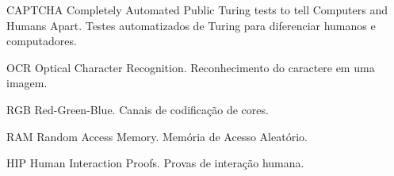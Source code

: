 \begin{siglas}
  \item[CAPTCHA] Completely Automated Public Turing tests to tell Computers and Humans Apart. Testes automatizados de Turing para diferenciar humanos e computadores.
  \item[OCR] Optical Character Recognition. Reconhecimento do caractere em uma imagem.
  \item[RGB] Red-Green-Blue. Canais de codificação de cores.
  \item[RAM] Random Access Memory. Memória de Acesso Aleatório.
  \item[HIP] Human Interaction Proofs. Provas de interação humana.
\end{siglas}
